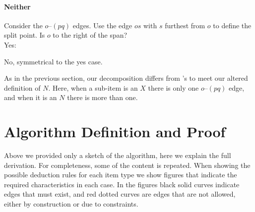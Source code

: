 \paragraph{Neither}
Consider the $o$--$(pq)$ edges.
Use the edge $os$ with $s$ furthest from $o$ to define the split point.
Is $o$ to the right of the span? \\
Yes: \\
\begin{center}
\end{center}

\noindent
No, symmetrical to the yes case.

As in the previous section, our decomposition differs from \textcite{ec}'s to meet our altered definition of $N$.
Here, when a sub-item is an $X$ there is only one $o$--$(pq)$ edge, and when it is an $N$ there is more than one.


\section{Algorithm Definition and Proof} \label{sec:full-algorithm}

Above we provided only a sketch of the algorithm, here we explain the full derivation.
For completeness, some of the content is repeated.
When showing the possible deduction rules for each item type we show figures that indicate the required characteristics in each case.
In the figures black solid curves indicate edges that must exist, and red dotted curves are edges that are not allowed, either by construction or due to constraints.

